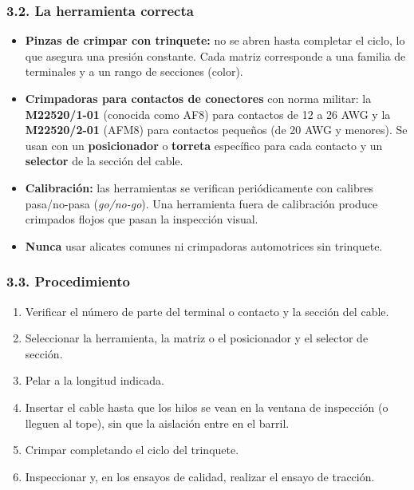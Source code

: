 \subsubsection*{3.2. La herramienta correcta}
\begin{itemize}
  \item \textbf{Pinzas de crimpar con trinquete:} no se abren hasta completar el ciclo, lo que
        asegura una presión constante. Cada matriz corresponde a una familia de terminales y a un
        rango de secciones (color).
  \item \textbf{Crimpadoras para contactos de conectores} con norma militar: la \textbf{M22520/1-01}
        (conocida como AF8) para contactos de 12 a 26 AWG y la \textbf{M22520/2-01} (AFM8) para
        contactos pequeños (de 20 AWG y menores). Se usan con un \textbf{posicionador} o
        \textbf{torreta} específico para cada contacto y un \textbf{selector} de la sección del
        cable.
  \item \textbf{Calibración:} las herramientas se verifican periódicamente con calibres
        pasa/no-pasa (\textit{go/no-go}). Una herramienta fuera de calibración produce crimpados
        flojos que pasan la inspección visual.
  \item \textbf{Nunca} usar alicates comunes ni crimpadoras automotrices sin trinquete.
\end{itemize}

\subsubsection*{3.3. Procedimiento}
\begin{enumerate}
  \item Verificar el número de parte del terminal o contacto y la sección del cable.
  \item Seleccionar la herramienta, la matriz o el posicionador y el selector de sección.
  \item Pelar a la longitud indicada.
  \item Insertar el cable hasta que los hilos se vean en la ventana de inspección (o lleguen al
        tope), sin que la aislación entre en el barril.
  \item Crimpar completando el ciclo del trinquete.
  \item Inspeccionar y, en los ensayos de calidad, realizar el ensayo de tracción.
\end{enumerate}

